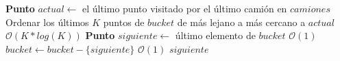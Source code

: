 \begin{algorithm}[H]
\caption{\Comment $\mathcal{O}(K*log(K))$}
\begin{algorithmic}[1]
	\State \textbf{Punto} $actual \gets$ el último punto visitado por el último camión en $camiones$
	\State Ordenar los últimos $K$ puntos de $bucket$ de más lejano a más cercano a $actual$ \Comment $\mathcal{O}(K*log(K))$
	\Statex
	\State \textbf{Punto} $siguiente \gets$ último elemento de $bucket$ \Comment $\mathcal{O}(1)$
	\State $bucket \gets bucket - \{siguiente\}$ \Comment $\mathcal{O}(1)$
	\Statex
	\State \Return $siguiente$
\EndFunction
\end{algorithmic}
\end{algorithm}